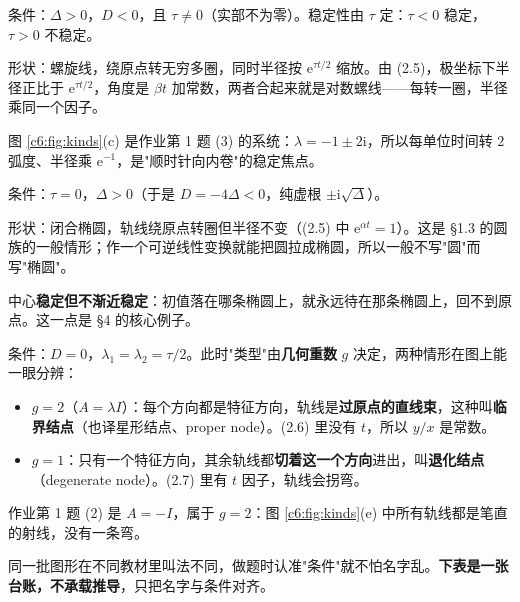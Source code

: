 \documentclass[11pt]{ctexart}
\begin{document}

条件：$\Delta>0$，$D<0$，且 $\tau\neq0$（实部不为零）。稳定性由 $\tau$ 定：$\tau<0$ 稳定，$\tau>0$ 不稳定。

形状：螺旋线，绕原点转无穷多圈，同时半径按 $\mathrm{e}^{\tau t/2}$ 缩放。由 (2.5)，极坐标下半径正比于 $\mathrm{e}^{\tau t/2}$，角度是 $\beta t$ 加常数，两者合起来就是对数螺线——每转一圈，半径乘同一个因子。

图 \ref{c6:fig:kinds}(c) 是作业第 1 题 (3) 的系统：$\lambda=-1\pm2\mathrm{i}$，所以每单位时间转 $2$ 弧度、半径乘 $\mathrm{e}^{-1}$，是"顺时针向内卷"的稳定焦点。


条件：$\tau=0$，$\Delta>0$（于是 $D=-4\Delta<0$，纯虚根 $\pm\mathrm{i}\sqrt{\Delta}$）。

形状：闭合椭圆，轨线绕原点转圈但半径不变（(2.5) 中 $\mathrm{e}^{\alpha t}=1$）。这是 §1.3 的圆族的一般情形；作一个可逆线性变换就能把圆拉成椭圆，所以一般不写"圆"而写"椭圆"。

中心\textbf{稳定但不渐近稳定}：初值落在哪条椭圆上，就永远待在那条椭圆上，回不到原点。这一点是 §4 的核心例子。


条件：$D=0$，$\lambda_1=\lambda_2=\tau/2$。此时"类型"由\textbf{几何重数} $g$ 决定，两种情形在图上能一眼分辨：

\begin{itemize}
\item $g=2$（$A=\lambda I$）：每个方向都是特征方向，轨线是\textbf{过原点的直线束}，这种叫\textbf{临界结点}（也译星形结点、proper node）。(2.6) 里没有 $t$，所以 $y/x$ 是常数。
\item $g=1$：只有一个特征方向，其余轨线都\textbf{切着这一个方向}进出，叫\textbf{退化结点}（degenerate node）。(2.7) 里有 $t$ 因子，轨线会拐弯。
\end{itemize}

作业第 1 题 (2) 是 $A=-I$，属于 $g=2$：图 \ref{c6:fig:kinds}(e) 中所有轨线都是笔直的射线，没有一条弯。


同一批图形在不同教材里叫法不同，做题时认准"条件"就不怕名字乱。\textbf{下表是一张台账，不承载推导}，只把名字与条件对齐。
\end{document}
